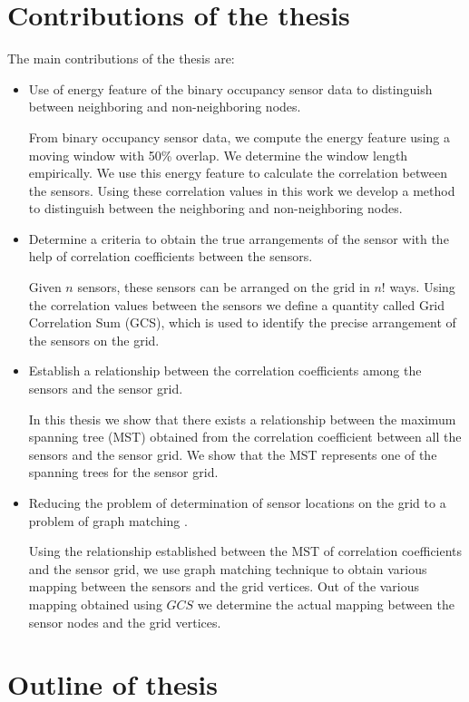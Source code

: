\section{Contributions of the thesis}
The main contributions of the thesis are:
\begin{itemize}
\item Use of energy feature of the binary occupancy sensor data to distinguish between neighboring and non-neighboring nodes.\par
From binary occupancy sensor data, we compute the energy feature using a moving window with 50\% overlap. We determine the window length empirically. We use this energy feature to calculate the correlation between the sensors. Using these correlation values in this work we develop a method to distinguish between the neighboring and non-neighboring nodes.
\item Determine a criteria to obtain the true arrangements of the sensor with the help of correlation coefficients between the sensors.\par
Given $n$ sensors, these sensors can be arranged on the grid in $n!$ ways. Using the correlation values between the sensors we define a quantity called Grid Correlation Sum (GCS), which is used to identify the precise arrangement of the sensors on the grid.
\item Establish a relationship between the correlation coefficients among the sensors and the sensor grid.\par
In this thesis we show that there exists a relationship between the maximum spanning tree (MST) obtained from the correlation coefficient between all the sensors and the sensor grid. We show that the MST represents one of the spanning trees for the sensor grid.
\item Reducing the problem of determination of sensor locations  on the grid to a problem of graph matching \cite{conte2004thirty}.\par
 Using the relationship established between the MST of correlation coefficients and the sensor grid, we use graph matching technique to obtain various mapping between the sensors and the grid vertices. Out of the various mapping obtained using $GCS$ we determine the actual mapping  between the sensor nodes and the grid vertices.
\end{itemize}

\section{Outline of thesis}

